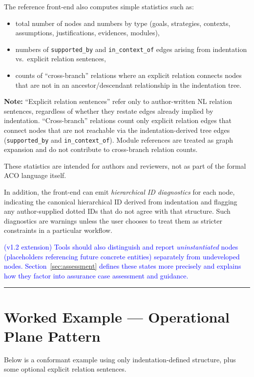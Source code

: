 \documentclass[11pt]{article}
\begin{document}
The reference front-end also computes simple statistics such as:
\begin{itemize}[leftmargin=2em]
  \item total number of nodes and numbers by type (goals, strategies, contexts, assumptions, justifications, evidences, modules),
  \item numbers of \texttt{supported\_by} and \texttt{in\_context\_of} edges arising from indentation vs.\ explicit relation sentences,
  \item counts of ``cross-branch'' relations where an explicit relation connects nodes that are not in an ancestor/descendant relationship in the indentation tree.
\end{itemize}
%
\noindent\textbf{Note:} ``Explicit relation sentences'' refer only to author-written NL relation sentences, regardless of whether they restate edges already implied by indentation.
``Cross-branch'' relations count only explicit relation edges that connect nodes that are not reachable via the indentation-derived tree edges (\texttt{supported\_by} and \texttt{in\_context\_of}).
Module references are treated as graph expansion and do not contribute to cross-branch relation counts.


These statistics are intended for authors and reviewers, not as part of the formal ACO language itself.

In addition, the front-end can emit \emph{hierarchical ID diagnostics} for each node, indicating the canonical hierarchical ID derived from indentation and flagging any author-supplied dotted IDs that do not agree with that structure. Such diagnostics are warnings unless the user chooses to treat them as stricter constraints in a particular workflow.

\textcolor{blue}{(v1.2 extension) Tools should also distinguish and report \emph{uninstantiated} nodes (placeholders referencing future concrete entities) separately from undeveloped nodes. Section~\ref{sec:assessment} defines these states more precisely and explains how they factor into assurance case assessment and guidance.}

\bigskip
\hrule
\bigskip

\section{Worked Example --- Operational Plane Pattern}

Below is a conformant example using only indentation-defined structure, plus some optional explicit relation sentences.
\end{document}

